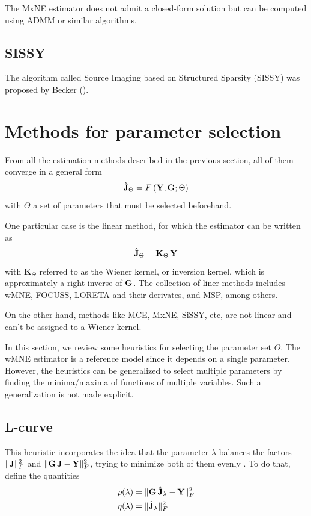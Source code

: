 The MxNE estimator does not admit a closed-form solution but can be computed using ADMM or similar algorithms.

\subsection{SISSY}

The algorithm called Source Imaging based on Structured Sparsity (SISSY) was proposed by Becker ().



\section{Methods for parameter selection}

From all the estimation methods described in the previous section, all of them converge in a general form
\begin{equation}
\hat{\mathbf{J}}_\Theta = F\left(  \mathbf{Y}, \mathbf{G}; \Theta  \right)
\end{equation}
with $\Theta$ a set of parameters that must be selected beforehand.

One particular case is the linear method, for which the estimator can be written as
\begin{equation}
\hat{\mathbf{J}}_\Theta
=
\mathbf{K}_{\Theta}\, \mathbf{Y}
\end{equation}
with $\mathbf{K}_{\Theta}$ referred to as the Wiener kernel, or inversion kernel, which is approximately a right inverse of $\mathbf{G}$.
%
The collection of liner methods includes wMNE, FOCUSS, LORETA and their derivates, and MSP, among others. 

On the other hand, methods like MCE, MxNE, SiSSY, etc, are not linear and can't be assigned to a Wiener kernel.

In this section, we review some heuristics for selecting the parameter set $\Theta$.
%
The wMNE estimator is a reference model since it depends on a single parameter.
%
However, the heuristics can be generalized to select multiple parameters by finding the minima/maxima of functions of multiple variables.
%
Such a generalization is not made explicit.

\subsection{L-curve}

This heuristic incorporates the idea that the parameter $\lambda$ balances the factors $\lVert \mathbf{J} \rVert_F^2$ and $\lVert \mathbf{G}\, \mathbf{J} - \mathbf{Y} \rVert_F^2$, trying to minimize both of them evenly \cite{Lcurve}.
%
To do that, define the quantities
\begin{align}
\rho(\lambda)
&=
\lVert \mathbf{G}\, \hat{\mathbf{J}}_\lambda - \mathbf{Y} \rVert_F^2
\\
\eta(\lambda)
&=
\lVert \hat{\mathbf{J}}_\lambda \rVert_F^2 
\label{det:Lcurve}
\end{align}

